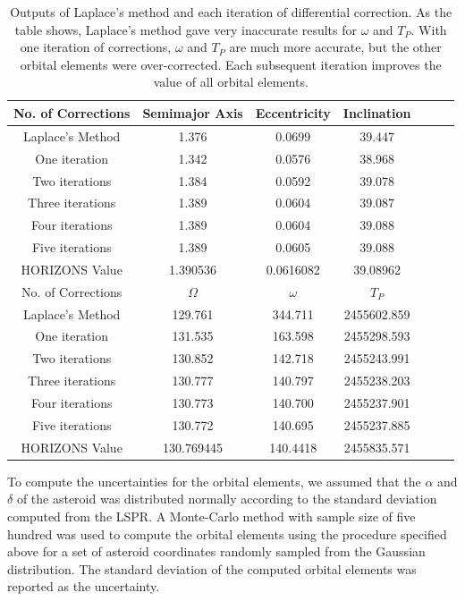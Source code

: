 \documentclass[12pt,journal,compsoc]{IEEEtran}
\begin{document}
\begin{table}[!t]
\centering
\begin{tabular}{|c|c|c|c|c|c|c|}
\hline
No. of Corrections & Semimajor Axis & Eccentricity & Inclination \\ \hline
Laplace's Method &1.376& 0.0699& 39.447 \\ \hline
One iteration &1.342& 0.0576& 38.968 \\ \hline
Two iterations &1.384& 0.0592& 39.078 \\ \hline
Three iterations &1.389& 0.0604& 39.087 \\ \hline
Four iterations &1.389& 0.0604& 39.088 \\ \hline
Five iterations &1.389& 0.0605& 39.088 \\ \hline
HORIZONS Value & 1.390536 & 0.0616082& 39.08962  \\ \hline \hline 
No. of Corrections & $\Omega$ & $\omega$ & $T_P$\\ \hline
Laplace's Method & 129.761& 344.711& 2455602.859\\ \hline
One iteration & 131.535& 163.598& 2455298.593\\ \hline
Two iterations & 130.852& 142.718& 2455243.991\\ \hline
Three iterations & 130.777& 140.797& 2455238.203\\ \hline
Four iterations & 130.773& 140.700& 2455237.901\\ \hline
Five iterations & 130.772& 140.695& 2455237.885\\ \hline \hline
HORIZONS Value & 130.769445 & 140.4418 & 2455835.571 \\ \hline
\end{tabular}
\caption{\label{tab:serieslist} Outputs of Laplace's method and each iteration of differential correction. 
As the table shows, Laplace's method gave very inaccurate results for $\omega$ and $T_P$.
With one iteration of corrections, $\omega$ and $T_P$ are much more accurate, but the other orbital elements
were over-corrected. Each subsequent iteration improves the value of all orbital elements.}
\end{table}

To compute the uncertainties for the orbital elements, we assumed that the $\alpha$ and $\delta$ of the asteroid was distributed normally according to the standard deviation computed from the LSPR.
A Monte-Carlo method with sample size of five hundred was used to compute the orbital elements using the procedure specified above for a set of asteroid coordinates randomly sampled from the Gaussian distribution.
The standard deviation of the computed orbital elements was reported as the uncertainty.
\end{document}
